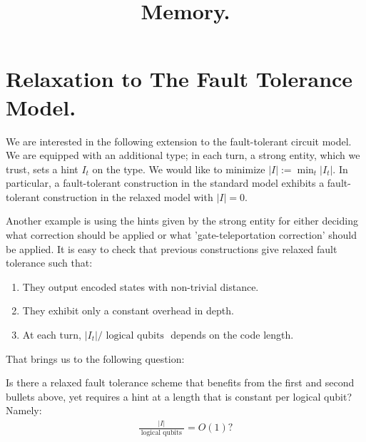 \documentclass[manuscript,screen,review]{acmart}
\begin{document}

\title{ Memory. }
\maketitle

\newcommand*{\Mbas}{\mathcal{X}^\prime}
\newcommand*{\bas}{\mathcal{X}}
\newcommand*{\sMbas}{\Mbas}
\newcommand*{\QQ}{C_{X}/C_{Z}^\perp }
\newcommand*{\trig}{ Triorthogonal }
\newcommand*{\Hyp}{ Hyperproduct }
\newcommand*{\Cin}{ C_{\text{initial}} }
\newcommand*{\Ctan}{ C_{\text{Tan}} }



\newcommand*{\QACze}{\mathbf{QAC}_{0}}
\newcommand*{\QNCzef}{\mathbf{QNC}_{0,f}}
\newcommand*{\QNCze}{\mathbf{QNC}_{0}}
\newcommand*{\QNCon}{\mathbf{QNC}_{1}}
\newcommand*{\NCon}{\mathbf{NC}_{1}}
\newcommand*{\noiseQNCon}{noisy-$\QNCon$}
\newcommand*{\QNC}{\mathbf{QNC}}
\newcommand*{\QNCG}{\mathbf{QNC_G}}
\newcommand*{\NC}{\mathbf{NC}}
\newcommand*{\QNCiG}{\mathbf{QNC_{G,i}}}


\newcommand*{\CDO} {CDFT} 

\section{Relaxation to The Fault Tolerance Model.} We are interested in the following extension to the fault-tolerant circuit model. We are equipped with an additional type; in each turn, a strong entity, which we trust, sets a hint $I_{t}$ on the type. We would like to minimize $|I| := \min_{t} |I_{t}|$. In particular, a fault-tolerant construction in the standard model exhibits a fault-tolerant construction in the relaxed model with $|I| = 0$.

Another example is using the hints given by the strong entity for either deciding what correction should be applied or what 'gate-teleportation correction' should be applied. It is easy to check that previous constructions give relaxed fault tolerance such that:     
\begin{enumerate}
  \item They output encoded states with non-trivial distance. 
  \item They exhibit only a constant overhead in depth. 
  \item At each turn, $|I_{t}| / \text{ logical qubits }$ depends on the code length.  
\end{enumerate}
That brings us to the following question:
\begin{oproblem}
Is there a relaxed fault tolerance scheme that benefits from the first and second bullets above, yet requires a hint at a length that is constant per logical qubit? Namely:
  \begin{equation*}
    \begin{split}
      \frac{ |I| } { \text{ logical qubits } } = O(1) ? 
    \end{split}
  \end{equation*}
\end{oproblem}
\end{document}
